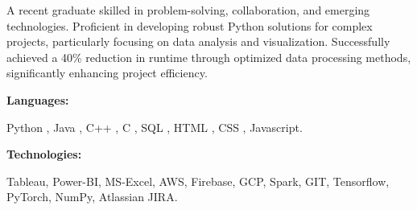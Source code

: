\documentclass[9pt]{developercv} %
\begin{document}
\begin{minipage}[t]{0.46\textwidth}
	\vspace{-6pt}
 
	A recent graduate skilled in problem-solving, collaboration, and emerging technologies. Proficient in developing robust Python solutions for complex projects, particularly focusing on data analysis and visualization. Successfully achieved a 40\% reduction in runtime through optimized data processing methods, significantly enhancing project efficiency. \\
\end{minipage}
\hfill %
\begin{minipage}[t]{0.465\textwidth}
    \vspace{-6pt}
    
    \begin{minipage}[t]{0.2\textwidth}
        \textbf{Languages:}
    \end{minipage}
    \hfill
    \begin{minipage}[t]{0.73\textwidth}
      Python , Java , C++ , C , SQL , HTML , CSS , Javascript.  
    \end{minipage}
    \vspace{4mm}
    
    \begin{minipage}[t]{0.2\textwidth}
        \textbf{Technologies:}
    \end{minipage}
    \hfill
    \begin{minipage}[t]{0.73\textwidth}
      Tableau, Power-BI, MS-Excel, AWS, Firebase, GCP, Spark, GIT, Tensorflow, PyTorch, NumPy, Atlassian JIRA.
    \end{minipage}
    
    
\end{minipage}
\end{document}
